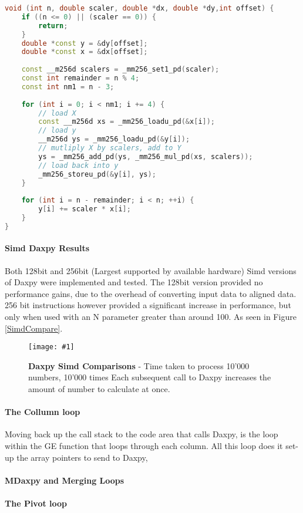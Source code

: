 \documentclass[conference]{acmsiggraph}
\newcommand{\figuremacroF}[4]{
	\begin{figure*}[t] %
		\centering
		\texttt{[image: \#1]}
		\caption[#2]{\textbf{#2} - #3}
		\label{fig:#1}
	\end{figure*}
}
\begin{document}
\begin{lstlisting}[language=C++,caption={Simd daxpy Code},label=SimdDaxpyCode]
void (int n, double scaler, double *dx, double *dy,int offset) {
	if ((n <= 0) || (scaler == 0)) {
		return;
	}
	double *const y = &dy[offset];
	double *const x = &dx[offset];
	
	const __m256d scalers = _mm256_set1_pd(scaler);
	const int remainder = n % 4;
	const int nm1 = n - 3;
	
	for (int i = 0; i < nm1; i += 4) {
		// load X
		const __m256d xs = _mm256_loadu_pd(&x[i]);
		// load y
		__m256d ys = _mm256_loadu_pd(&y[i]);
		// mutliply X by scalers, add to Y
		ys = _mm256_add_pd(ys, _mm256_mul_pd(xs, scalers));
		// load back into y
		_mm256_storeu_pd(&y[i], ys);
	}
	
	for (int i = n - remainder; i < n; ++i) {
		y[i] += scaler * x[i];
	}
}
\end{lstlisting}

\paragraph{Simd Daxpy Results}
Both 128bit and 256bit (Largest supported by available hardware) Simd versions of Daxpy were implemented and tested.
The 128bit version provided no performance gains, due to the overhead of converting input data to aligned data.
256 bit instructions however provided a significant increase in performance, but only when used with an N parameter greater than around 100. As seen in Figure \ref{SimdCompare}.

\figuremacroF
{SimdCompare}
{Daxpy Simd Comparisons}
{Time taken to process 10'000 numbers, 10'000 times Each subsequent call to Daxpy increases the amount of number to calculate at once.}
{1.0}

\paragraph{The Collumn loop}
Moving back up the call stack to the code area that calls Daxpy, is the loop within the GE function that loops through each column.
All this loop does it set-up the array pointers to send to Daxpy, 

\paragraph{MDaxpy and Merging Loops}


\paragraph{The Pivot loop}
\end{document}
